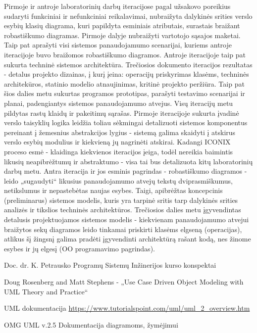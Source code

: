 \documentclass{VUMIFPSkursinis}
\begin{document}
Pirmoje ir antroje laboratorinių darbų iteracijose pagal užsakovo poreikius sudaryti funkciniai ir nefunkciniai reikalavimai, nubraižyta dalykinės srities verslo esybių klasių diagrama, kuri papildyta esminiais atributais, surastais braižant robastiškumo diagramas. Pirmoje dalyje nubraižyti vartotojo sąsajos maketai. Taip pat aprašyti visi sistemos panaudojamumo scenarijai, kuriems antroje iteracijoje buvo braižomos robastiškumo diagramos. Antroje iteracijoje taip pat sukurta techninė sistemos architektūra. Trečiosios dokumento iteracijos rezultatas - detalus projekto dizainas, į kurį įeina: operacijų priskyrimas klasėms, techninės architekūros, statinio modelio atnaujinimas, kritinė projekto peržiūra. Taip pat šios dalies metu sukurtas programos prototipas, parašyti testavimo scenarijai ir planai, padengiantys sistemos panaudojamumo atvejus. Visų iteracijų metu pildytas rastų klaidų ir pakeitimų sąrašas.
Pirmoje iteracijoje sukurta įvadinė verslo taisyklių logika leidžia toliau sėkmingai detalizuoti sistemos komponentus pereinant į žemesnius abstrakcijos lygius - sistemą galima skaidyti į atskirus verslo esybių modulius ir kiekvieną jų nagrinėti atskirai. Kadangi ICONIX proceso esmė - klaidinga kiekvienos iteracijos įeiga, todėl nereikia baimintis likusių neapibrėžtumų ir abstraktumo - visa tai bus detalizuota kitų laboratorinių darbų metu. Antra iteracija ir jos esminis pagrindas - robastiškumo diagramos - leido „sugaudyti“ likusius panaudojamumo atvejų tekstų dviprasmiškumus, netikslumus ir nepastebėtas naujas esybes. Taigi, apibrėžtas koncepcinis (preliminarus) sistemos modelis, kuris yra tarpinė sritis tarp dalykinės srities analizės ir tikslios techninės architektūros. Trečiosios dalies metu įgyvendintas detalusis projektuojamos sistemos modelis - kiekvienam panaudojamumo atvejui braižytos sekų diagramos leido tinkamai priskirti klasėms elgseną (operacijas), atlikus šį žingsnį galima pradėti įgyvendinti architektūrą rašant kodą, nes žinome esybes ir jų elgesį (OO programavimo pagrindas).


\begin{enumerate}[label={[\arabic*]},itemsep=-2mm]
	\item Doc. dr. K. Petrausko Programų Sistemų Inžinerijos kurso konspektai
	\label{petrauskas}
	\item Doug Rosenberg and Matt Stephens - „Use Case Driven Object Modeling with UML Theory and Practice“
	\label{iconix}
	\item UML dokumentacija \url{https://www.tutorialspoint.com/uml/uml_2_overview.htm}
	\label{uml}
	\item OMG UML v.2.5 Dokumentacija diagramoms, žymėjimui
	\label{omguml}
\end{enumerate}
\end{document}

